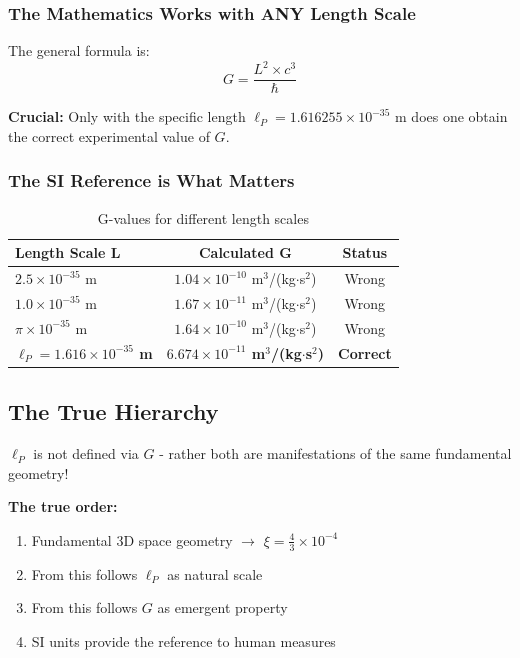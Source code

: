 	\subsubsection{The Mathematics Works with ANY Length Scale}
	
	The general formula is:
	\begin{equation}
		G = \frac{L^2 \times c^3}{\hbar}
	\end{equation}
	
	\textbf{Crucial:} Only with the specific length $\ell_P = 1.616255 \times 10^{-35}$ m does one obtain the correct experimental value of $G$.
	
	\subsubsection{The SI Reference is What Matters}
	
	\begin{table}[h]
		\centering
		\begin{tabular}{@{}lcc@{}}
			\toprule
			\textbf{Length Scale L} & \textbf{Calculated G} & \textbf{Status} \\
			\midrule
			$2.5 \times 10^{-35}$ m & $1.04 \times 10^{-10}$ m$^3$/(kg$\cdot$s$^2$) & Wrong \\
			$1.0 \times 10^{-35}$ m & $1.67 \times 10^{-11}$ m$^3$/(kg$\cdot$s$^2$) & Wrong \\
			$\pi \times 10^{-35}$ m & $1.64 \times 10^{-10}$ m$^3$/(kg$\cdot$s$^2$) & Wrong \\
			\textbf{$\ell_P = 1.616 \times 10^{-35}$ m} & \textbf{$6.674 \times 10^{-11}$ m$^3$/(kg$\cdot$s$^2$)} & \textbf{Correct} \\
			\bottomrule
		\end{tabular}
		\caption{G-values for different length scales}
	\end{table}
	
	\subsection{The True Hierarchy}
	
	\begin{tcolorbox}[colback=green!5!white,colframe=green!75!black,title=Correct Interpretation]
		$\ell_P$ is not defined via $G$ - rather both are manifestations of the same fundamental geometry!
		
		\textbf{The true order:}
		\begin{enumerate}
			\item Fundamental 3D space geometry $\rightarrow$ $\xi = \frac{4}{3} \times 10^{-4}$
			\item From this follows $\ell_P$ as natural scale
			\item From this follows $G$ as emergent property  
			\item SI units provide the reference to human measures
		\end{enumerate}
	\end{tcolorbox}
	
